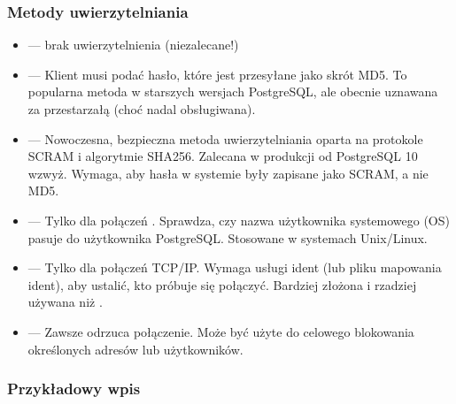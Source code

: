 \documentclass[letterpaper,10pt,polish]{sphinxmanual}
\begin{document}
\subsubsection{Metody uwierzytelniania}
\label{\detokenize{rozdzial2/bezpieczenstwo/index:metody-uwierzytelniania}}\begin{itemize}
\item {} 
\sphinxAtStartPar
{} — brak uwierzytelnienia (niezalecane!)

\item {} 
\sphinxAtStartPar
{} — Klient musi podać hasło, które jest przesyłane jako skrót MD5.
To popularna metoda w starszych wersjach PostgreSQL, ale obecnie uznawana za przestarzałą (choć nadal obsługiwana).

\item {} 
\sphinxAtStartPar
{} — Nowoczesna, bezpieczna metoda uwierzytelniania oparta na protokole SCRAM i algorytmie SHA\sphinxhyphen{}256.
Zalecana w produkcji od PostgreSQL 10 wzwyż. Wymaga, aby hasła w systemie były zapisane jako SCRAM, a nie MD5.

\item {} 
\sphinxAtStartPar
{} — Tylko dla połączeń . Sprawdza, czy nazwa użytkownika systemowego (OS) pasuje do użytkownika PostgreSQL.
Stosowane w systemach Unix/Linux.

\item {} 
\sphinxAtStartPar
{} — Tylko dla połączeń TCP/IP. Wymaga usługi ident (lub pliku mapowania ident), aby ustalić, kto próbuje się połączyć.
Bardziej złożona i rzadziej używana niż .

\item {} 
\sphinxAtStartPar
{} — Zawsze odrzuca połączenie. Może być użyte do celowego blokowania określonych adresów lub użytkowników.

\end{itemize}


\subsubsection{Przykładowy wpis}
\label{\detokenize{rozdzial2/bezpieczenstwo/index:przykladowy-wpis}}
\begin{sphinxVerbatim}[commandchars=\\\{\}]
                                                
\end{sphinxVerbatim}
\end{document}
